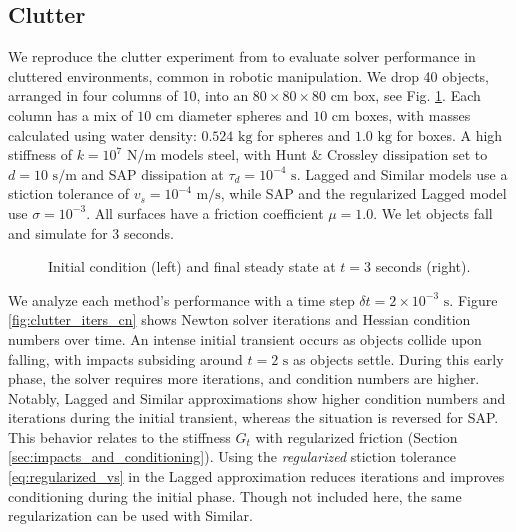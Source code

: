 \subsection{Clutter}
\label{sec:clutter}

We reproduce the clutter experiment from \cite{bib:castro2022unconstrained} to
evaluate solver performance in cluttered environments, common in robotic
manipulation. We drop 40 objects, arranged in four columns of 10, into an $80
\times 80 \times 80\text{ cm}$ box, see Fig. \ref{fig:clutter_initial_final}.
Each column has a mix of $10\text{ cm}$ diameter spheres and $10\text{ cm}$
boxes, with masses calculated using water density: $0.524\text{ kg}$ for spheres
and $1.0\text{ kg}$ for boxes. A high stiffness of $k=10^{7}\text{ N}/\text{m}$
models steel, with Hunt \& Crossley dissipation set to $d=10\text{ s}/\text{m}$
and SAP dissipation at $\tau_d=10^{-4} \text{ s}$. Lagged and Similar models use
a stiction tolerance of $v_s = 10^{-4}\text{ m}/\text{s}$, while SAP and the
regularized Lagged model use $\sigma=10^{-3}$. All surfaces have a friction
coefficient $\mu=1.0$. We let objects fall and simulate for $3$ seconds.

\begin{figure}[!h]
    \centering
    \caption{\label{fig:clutter_initial_final} Initial condition (left) and
    final steady state at $t=3$ seconds (right).}
\end{figure}

We analyze each method's performance with a time step $\delta
t=2\times10^{-3}\text{ s}$. Figure \ref{fig:clutter_iters_cn} shows Newton
solver iterations and Hessian condition numbers over time. An intense initial
transient occurs as objects collide upon falling, with impacts subsiding around
$t=2 \text{ s}$ as objects settle. During this early phase, the solver requires
more iterations, and condition numbers are higher. Notably, Lagged and Similar
approximations show higher condition numbers and iterations during the initial
transient, whereas the situation is reversed for SAP. This behavior relates to
the stiffness $G_t$ with regularized friction (Section
\ref{sec:impacts_and_conditioning}). Using the \emph{regularized} stiction
tolerance \eqref{eq:regularized_vs} in the Lagged approximation reduces
iterations and improves conditioning during the initial phase. Though not
included here, the same regularization can be used with Similar.

